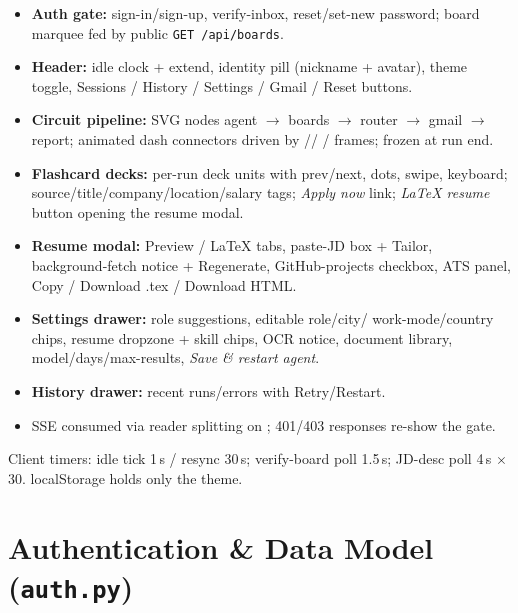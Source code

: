 \documentclass[11pt,a4paper]{article}
\newcommand{\file}[1]{\texttt{\small #1}}
\newcommand{\api}[2]{\texttt{\small #1\,#2}}
\begin{document}
\begin{itemize}[leftmargin=2em]
  \item \textbf{Auth gate:} sign-in/sign-up, verify-inbox, reset/set-new
        password; board marquee fed by public \api{GET}{/api/boards}.
  \item \textbf{Header:} idle clock + extend, identity pill (nickname +
        avatar), theme toggle, Sessions / History / Settings / Gmail /
        Reset buttons.
  \item \textbf{Circuit pipeline:} SVG nodes agent $\rightarrow$ boards
        $\rightarrow$ router $\rightarrow$ gmail $\rightarrow$ report;
        animated dash connectors driven by //
        / frames; frozen at run end.
  \item \textbf{Flashcard decks:} per-run deck units with prev/next, dots,
        swipe, keyboard; source/title/company/location/salary tags;
        \emph{Apply now} link; \emph{LaTeX resume} button opening the
        resume modal.
  \item \textbf{Resume modal:} Preview / LaTeX tabs, paste-JD box +
        Tailor, background-fetch notice + Regenerate, GitHub-projects
        checkbox, ATS panel, Copy / Download .tex / Download HTML.
  \item \textbf{Settings drawer:} role suggestions, editable role/city/
        work-mode/country chips, resume dropzone + skill chips, OCR
        notice, document library, model/days/max-results, \emph{Save \&
        restart agent}.
  \item \textbf{History drawer:} recent runs/errors with Retry/Restart.
  \item SSE consumed via  reader splitting on ;
        401/403 responses re-show the gate.
\end{itemize}

Client timers: idle tick 1\,s / resync 30\,s; verify-board poll 1.5\,s;
JD-desc poll 4\,s $\times$ 30. localStorage holds only the theme.

\section{Authentication \& Data Model (\file{auth.py})}
\label{sec:auth}
\end{document}
